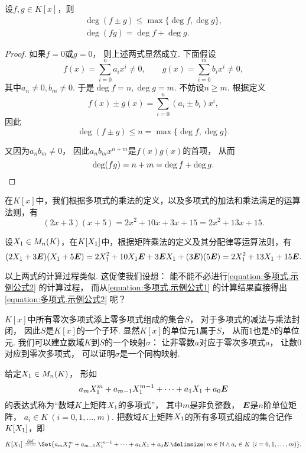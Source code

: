 \begin{proposition}
设\(f,g \in K[x]\)，则\begin{gather}
	\deg(f \pm g) \leq \max\{\deg f, \deg g\},
	\label{equation:多项式.和的次数} \\
	\deg(fg) = \deg f + \deg g.
	\label{equation:多项式.积的次数}
\end{gather}
\begin{proof}
如果\(f=0\)或\(g=0\)，
则上述两式显然成立.
下面假设\[
	f(x)
	= \sum_{i=0}^n a_i x^i
	\neq0, \qquad
	g(x)
	= \sum_{i=0}^m b_i x^i
	\neq0,
\]
其中\(a_n\neq0,b_m\neq0\).
于是\(\deg f=n,
\deg g=m\).
不妨设\(n \geq m\).
根据定义\[
	f(x) \pm g(x)
	= \sum_{i=0}^n (a_i \pm b_i) x^i,
\]
因此\[
	\deg(f \pm g)
	\leq n
	= \max\{
		\deg f,
		\deg g
	\}.
\]

又因为\(a_n b_m \neq 0\)，
因此\(a_n b_m x^{n+m}\)是\(f(x) g(x)\)的首项，
从而\[
	\deg(fg) = n+m = \deg f + \deg g.
	\qedhere
\]
\end{proof}
\end{proposition}

在\(K[x]\)中，我们根据多项式的乘法的定义，以及多项式的加法和乘法满足的运算法则，有
\begin{equation}\label{equation:多项式.示例公式1}
	(2x+3)(x+5)
	=2x^2+10x+3x+15
	=2x^2+13x+15.
\end{equation}

设\(X_1 \in M_n(K)\)，在\(K[X_1]\)中，根据矩阵乘法的定义及其分配律等运算法则，有
\begin{equation}\label{equation:多项式.示例公式2}
	(2X_1+3\boldsymbol{E})(X_1+5\boldsymbol{E})
	=2X_1^2+10X_1\boldsymbol{E}+3\boldsymbol{E}X_1+(3\boldsymbol{E})(5\boldsymbol{E})
	=2X_1^2+13X_1+15\boldsymbol{E}.
\end{equation}

以上两式的计算过程类似.
这促使我们设想：
能不能不必进行\cref{equation:多项式.示例公式2} 的计算过程，
而从\cref{equation:多项式.示例公式1}
的计算结果直接得出\cref{equation:多项式.示例公式2} 呢？

\(K[x]\)中所有零次多项式添上零多项式组成的集合\(S\)，
对于多项式的减法与乘法封闭，
因此\(S\)是\(K[x]\)的一个子环.
显然\(K[x]\)的单位元\(1\)属于\(S\)，
从而\(1\)也是\(S\)的单位元.
我们可以建立数域\(K\)到\(S\)的一个映射\(\sigma\)：
让非零数\(a\)对应于零次多项式\(a\)，
让数\(0\)对应到零次多项式，
可以证明\(\sigma\)是一个同构映射.

给定\(X_1\in M_n(K)\)，
形如\[
	a_m X_1^m + a_{m-1} X_1^{m-1} + \dotsb + a_1 X_1 + a_0 \boldsymbol{E}
\]的表达式称为“数域\(K\)上矩阵\(X_1\)的多项式”，
其中\(m\)是非负整数，
\(\boldsymbol{E}\)是\(n\)阶单位矩阵，
\(a_i \in K\ (i=0,1,\dotsc,m)\).
把数域\(K\)上矩阵\(X_1\)的所有多项式组成的集合记作\(K[X_1]\)，即\[
	K[\A]
	\defeq
	\Set{
		a_m \A^m + a_{m-1} \A^{m-1} + \dotsb + a_1 \A + a_0 \E
		\given
		m \in \mathbb{N}
		\land
		a_i \in K\ (i=0,1,\dotsc,m)
	}.
\]

